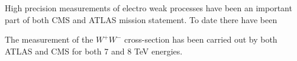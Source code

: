 

High precision measurements of electro weak processes have been an important part of both CMS and ATLAS mission statement.
To date there have been 


The measurement of the $W^+W^-$ cross-section has been carried out by both ATLAS and CMS for both 7 and 8 TeV  energies.
